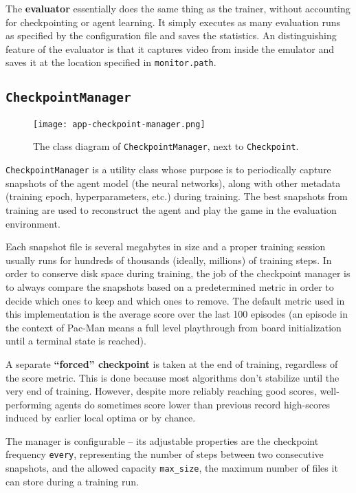 The \textbf{evaluator} essentially does the same thing as the trainer, without accounting for checkpointing or agent learning.
It simply executes as many evaluation runs as specified by the configuration file and saves the statistics.
An distinguishing feature of the evaluator is that it captures video from inside the emulator and saves it at the location specified in \texttt{monitor.path}.

\subsection{\texttt{CheckpointManager}}

\begin{figure}[ht]
    \centering
    \texttt{[image: app-checkpoint-manager.png]}
    \caption{The class diagram of \texttt{CheckpointManager}, next to \texttt{Checkpoint}.}
    \label{fig:checkpoint-manager}
\end{figure}

\texttt{CheckpointManager} is a utility class whose purpose is to periodically capture snapshots of the agent model (the neural networks), along with other metadata (training epoch, hyperparameters, etc.) during training.
The best snapshots from training are used to reconstruct the agent and play the game in the evaluation environment.

Each snapshot file is several megabytes in size and a proper training session usually runs for hundreds of thousands (ideally, millions) of training steps.
In order to conserve disk space during training, the job of the checkpoint manager is to always compare the snapshots based on a predetermined metric in order to decide which ones to keep and which ones to remove.
The default metric used in this implementation is the average score over the last 100 episodes (an episode in the context of Pac-Man means a full level playthrough from board initialization until a terminal state is reached).

A separate \textbf{``forced'' checkpoint} is taken at the end of training, regardless of the score metric.
This is done because most algorithms don’t stabilize until the very end of training.
However, despite more reliably reaching good scores, well-performing agents do sometimes score lower than previous record high-scores induced by earlier local optima or by chance.

The manager is configurable -- its adjustable properties are the checkpoint frequency \texttt{every}, 
representing the number of steps between two consecutive snapshots, and the allowed capacity
\verb|max_size|, the maximum number of files it can store during a training run.

